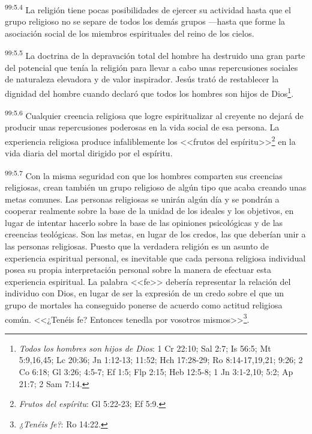 \documentclass[twoside, 11pt]{book}
\begin{document}
\par
\textsuperscript{99:5.4} La religión tiene pocas posibilidades de ejercer su actividad hasta que el grupo religioso no se separe de todos los demás grupos ---hasta que forme la asociación social de los miembros espirituales del reino de los cielos.

\par
\textsuperscript{99:5.5} La doctrina de la depravación total del hombre ha destruido una gran parte del potencial que tenía la religión para llevar a cabo unas repercusiones sociales de naturaleza elevadora y de valor inspirador. Jesús trató de restablecer la dignidad del hombre cuando declaró que todos los hombres son hijos de Dios\footnote{\textit{Todos los hombres son hijos de Dios}: 1 Cr 22:10; Sal 2:7; Is 56:5; Mt 5:9,16,45; Lc 20:36; Jn 1:12-13; 11:52; Hch 17:28-29; Ro 8:14-17,19,21; 9:26; 2 Co 6:18; Gl 3:26; 4:5-7; Ef 1:5; Flp 2:15; Heb 12:5-8; 1 Jn 3:1-2,10; 5:2; Ap 21:7; 2 Sam 7:14.}.

\par
\textsuperscript{99:5.6} Cualquier creencia religiosa que logre espiritualizar al creyente no dejará de producir unas repercusiones poderosas en la vida social de esa persona. La experiencia religiosa produce infaliblemente los <<frutos del espíritu>>\footnote{\textit{Frutos del espíritu}: Gl 5:22-23; Ef 5:9.} en la vida diaria del mortal dirigido por el espíritu.

\par
\textsuperscript{99:5.7} Con la misma seguridad con que los hombres comparten sus creencias religiosas, crean también un grupo religioso de algún tipo que acaba creando unas metas comunes. Las personas religiosas se unirán algún día y se pondrán a cooperar realmente sobre la base de la unidad de los ideales y los objetivos, en lugar de intentar hacerlo sobre la base de las opiniones psicológicas y de las creencias teológicas. Son las metas, en lugar de los credos, las que deberían unir a las personas religiosas. Puesto que la verdadera religión es un asunto de experiencia espiritual personal, es inevitable que cada persona religiosa individual posea su propia interpretación personal sobre la manera de efectuar esta experiencia espiritual. La palabra <<fe>> debería representar la relación del individuo con Dios, en lugar de ser la expresión de un credo sobre el que un grupo de mortales ha conseguido ponerse de acuerdo como actitud religiosa común. <<¿Tenéis fe? Entonces tenedla por vosotros mismos>>\footnote{\textit{¿Tenéis fe?}: Ro 14:22.}.
\end{document}
